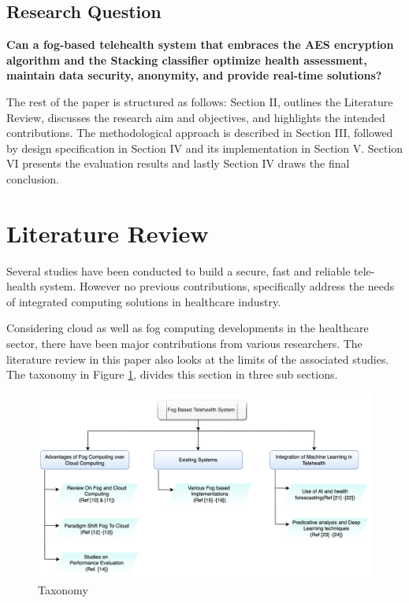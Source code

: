 \documentclass[10pt]{article}
\begin{document}
\subsection{Research Question}
\textbf{Can a fog-based telehealth system that embraces the AES encryption algorithm and the Stacking classifier optimize health assessment, maintain data security, anonymity, and provide real-time solutions?}
\newline

The rest of the paper is structured as follows: Section II, outlines the Literature Review, discusses the research aim and objectives, and highlights the intended contributions. The methodological approach is described in Section III, followed by design specification in Section IV and its implementation in Section V. Section VI presents the evaluation results and lastly Section IV draws the final conclusion.


\section{Literature Review} 

Several studies have been conducted to build a secure, fast and reliable tele-health system. However no previous contributions, specifically address the needs of integrated computing solutions in healthcare industry. 

\newline

Considering cloud as well as fog computing developments in the healthcare sector, there have been major contributions from various researchers. The literature review in this paper also looks at the limits of the associated studies. The taxonomy in Figure \ref{fig:2}, divides this section in three sub sections. 

\begin{figure}[H]
    \begin{center}
        \includegraphics[width=1\linewidth,frame]{CA2-template/RIC2.png}
        \caption{Taxonomy\label{fig:2}}
    \end{center}
\end{figure}
\end{document}
